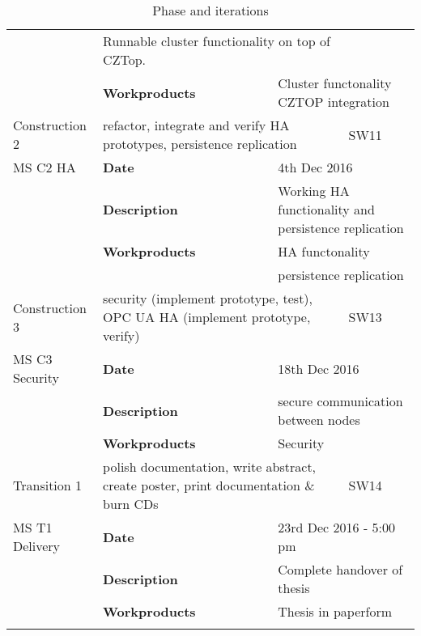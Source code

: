 \begin{center}
\begin{longtable}{|p{25mm}|p{25mm} p{45mm}|p{10mm}|}
		& \multicolumn{2}{l|}{Runnable cluster functionality on top of CZTop.} \\
		& \textbf{Workproducts}
		& \multicolumn{2}{l|}{Cluster functonality CZTOP integration} \\ \hline
	Construction 2
		& \multicolumn{2}{p{70mm}|}{refactor, integrate and verify HA prototypes, persistence replication}
		& SW11 \\ \hline
	MS C2 HA
		& \textbf{Date}
		& \multicolumn{2}{l|}{4th Dec 2016} \\
		& \textbf{Description}
		& \multicolumn{2}{l|}{Working HA functionality and persistence replication} \\
		& \textbf{Workproducts}
		& \multicolumn{2}{l|}{HA functonality} \\
		& & \multicolumn{2}{l|}{persistence replication} \\ \hline
	Construction 3
		& \multicolumn{2}{p{70mm}|}{security (implement prototype, test), OPC UA HA (implement prototype, verify)}
		& SW13 \\ \hline
	MS C3 Security
		& \textbf{Date}
		& \multicolumn{2}{l|}{18th Dec 2016} \\
		& \textbf{Description}
		& \multicolumn{2}{l|}{secure communication between nodes} \\
		& \textbf{Workproducts}
		& \multicolumn{2}{l|}{Security} \\ \hline
	Transition 1
		& \multicolumn{2}{p{70mm}|}{polish documentation, write abstract, create poster, print documentation \& burn CDs}
		& SW14 \\ \hline
	MS T1 Delivery
		& \textbf{Date}
		& \multicolumn{2}{l|}{23rd Dec 2016 - 5:00 pm} \\
		& \textbf{Description}
		& \multicolumn{2}{l|}{Complete handover of thesis} \\
		& \textbf{Workproducts}
		& \multicolumn{2}{l|}{Thesis in paperform} \\ \hline

   \caption{Phase and iterations} \label{tab:phases}
   \end{longtable}
\end{center}
